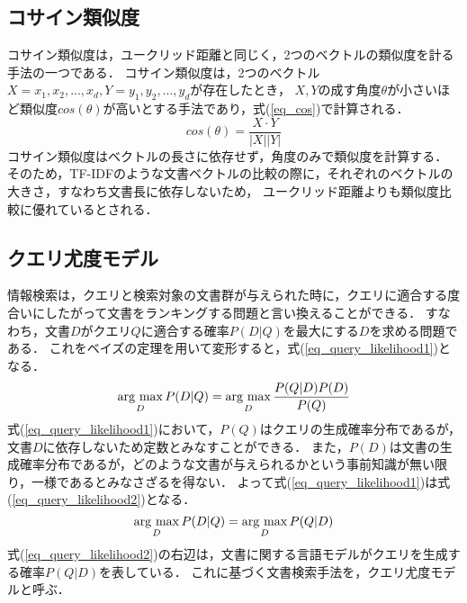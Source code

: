 \subsection{コサイン類似度} \label{sec_cosine}
コサイン類似度は，ユークリッド距離と同じく，2つのベクトルの類似度を計る手法の一つである．
コサイン類似度は，2つのベクトル$X = {x_1, x_2, ..., x_d}, Y = {y_1, y_2, ..., y_d}$が存在したとき，
$X, Y$の成す角度$\theta$が小さいほど類似度$cos(\theta)$が高いとする手法であり，式(\ref{eq_cos})で計算される．
\begin{equation}
    cos(\theta) = \frac{X \cdot Y}{|X||Y|}  \label{eq_cos}
\end{equation}
コサイン類似度はベクトルの長さに依存せず，角度のみで類似度を計算する．
そのため，TF-IDFのような文書ベクトルの比較の際に，それぞれのベクトルの大きさ，すなわち文書長に依存しないため，
ユークリッド距離よりも類似度比較に優れているとされる．

\subsection{クエリ尤度モデル}
情報検索は，クエリと検索対象の文書群が与えられた時に，クエリに適合する度合いにしたがって文書をランキングする問題と言い換えることができる．
すなわち，文書$D$がクエリ$Q$に適合する確率$P(D|Q)$を最大にする$D$を求める問題である．
これをベイズの定理を用いて変形すると，式(\ref{eq_query_likelihood1})となる．
\begin{equation}
    \mathop{\rm arg~max}\limits_{D} P(D|Q) = \mathop{\rm arg~max}\limits_{D} \frac{P(Q|D)P(D)}{P(Q)}    \label{eq_query_likelihood1}
\end{equation}
式(\ref{eq_query_likelihood1})において，$P(Q)$はクエリの生成確率分布であるが，文書$D$に依存しないため定数とみなすことができる．
また，$P(D)$は文書の生成確率分布であるが，どのような文書が与えられるかという事前知識が無い限り，一様であるとみなさざるを得ない．
よって式(\ref{eq_query_likelihood1})は式(\ref{eq_query_likelihood2})となる．
\begin{equation}
    \mathop{\rm arg~max}\limits_{D} P(D|Q) = \mathop{\rm arg~max}\limits_{D} P(Q|D) \label{eq_query_likelihood2}
\end{equation}
式(\ref{eq_query_likelihood2})の右辺は，文書に関する言語モデルがクエリを生成する確率$P(Q|D)$を表している．
これに基づく文書検索手法を，クエリ尤度モデルと呼ぶ．

